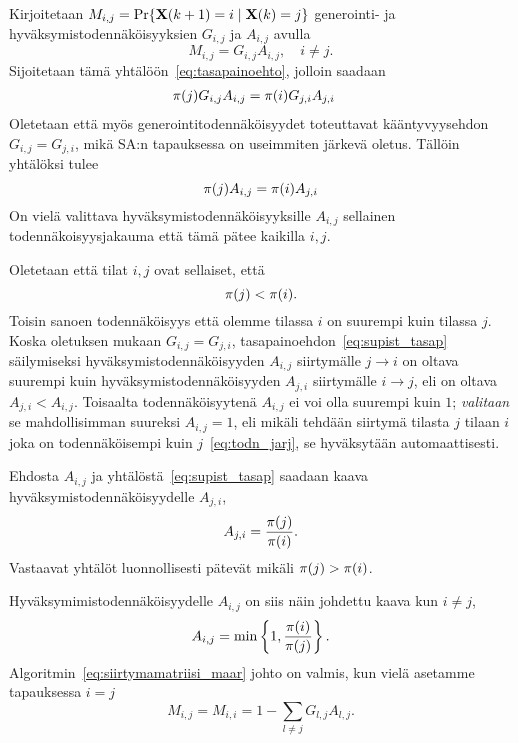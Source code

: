 Kirjoitetaan $M_{i,j} = \Pr\{\mathbf{X}(k+1) = i \mid \mathbf{X}(k) = j\}$ generointi- ja hyväksymistodennäköisyyksien $G_{i,j}$ ja $A_{i,j}$ avulla
\begin{equation*}
    M_{i,j} = G_{i,j}A_{i,j}, \quad i \not = j.
\end{equation*}
Sijoitetaan tämä yhtälöön~\eqref{eq:tasapainoehto}, jolloin saadaan
\begin{align}
    \mathbf{\pi}(j) G_{i,j}A_{i,j} &= \mathbf{\pi}(i) G_{j,i}A_{j,i}
\end{align}
Oletetaan että myös generointitodennäköisyydet toteuttavat kääntyvyysehdon $G_{i,j} = G_{j,i}$,
mikä SA:n tapauksessa on useimmiten järkevä oletus.
Tällöin yhtälöksi tulee
\begin{equation}
    \label{eq:supist_tasap}
    \mathbf{\pi}(j) A_{i,j} = \mathbf{\pi}(i) A_{j,i}
\end{equation}
On vielä valittava hyväksymistodennäköisyyksille $A_{i,j}$ sellainen todennäkoisyysjakauma että tämä pätee kaikilla $i,j$.

Oletetaan että tilat $i,j$ ovat sellaiset, että
\begin{equation}
    \label{eq:todn_jarj}
    \mathbf{\pi}(j) < \mathbf{\pi}(i).
\end{equation}
Toisin sanoen todennäköisyys että olemme tilassa $i$ on suurempi kuin tilassa $j$.
Koska oletuksen mukaan $G_{i,j} = G_{j,i}$,
tasapainoehdon~\eqref{eq:supist_tasap} säilymiseksi hyväksymistodennäköisyyden $A_{i,j}$ siirtymälle $j \to i$  on oltava suurempi kuin hyväksymistodennäköisyyden $A_{j,i}$ siirtymälle $i \to j$,
eli on oltava $A_{j,i} < A_{i,j}$.
Toisaalta todennäköisyytenä $A_{i,j}$ ei voi olla suurempi kuin $1$;
\emph{valitaan} se mahdollisimman suureksi $A_{i,j} = 1$,
eli mikäli tehdään siirtymä tilasta $j$ tilaan $i$ joka on todennäköisempi kuin $j$~\eqref{eq:todn_jarj},
se hyväksytään automaattisesti.

Ehdosta $A_{i,j}$ ja yhtälöstä~\eqref{eq:supist_tasap} saadaan kaava hyväksymistodennäköisyydelle $A_{j,i}$,
\begin{equation}
    A_{j,i} = \frac{\mathbf{\pi}(j)}{\mathbf{\pi}(i)}.
\end{equation}
Vastaavat yhtälöt luonnollisesti pätevät mikäli $\mathbf{\pi}(j) > \mathbf{\pi}(i)$.

Hyväksymimistodennäköisyydelle $A_{i,j}$ on siis näin johdettu kaava kun $i\not=j$,
\begin{equation}
    \label{eq:yleinen_metropolis}
    A_{i,j} = \min\left\{1, \frac{\mathbf{\pi}(i)}{\mathbf{\pi}(j)}\right\}.
\end{equation}
Algoritmin~\ref{eq:siirtymamatriisi_maar} johto on valmis, kun vielä asetamme tapauksessa $i=j$
\begin{equation}
    M_{i,j} = M_{i,i} =  1 - \sum_{l\not =j} G_{l,j}A_{l,j}.
\end{equation}

